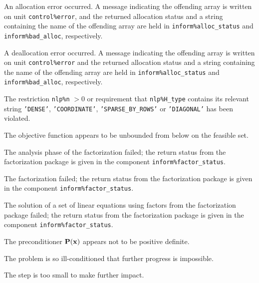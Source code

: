 \documentclass{galahad}
\begin{document}
\begin{description}

 An allocation error occurred.
A message indicating the offending
array is written on unit {\tt control\%error}, and the returned allocation
status and a string containing the name of the offending array
are held in {\tt inform\%alloc\_\-status}
and {\tt inform\%bad\_alloc}, respectively.

 A deallocation error occurred.
A message indicating the offending
array is written on unit {\tt control\%error} and the returned allocation
status and a string containing the name of the offending array
are held in {\tt inform\%alloc\_\-status}
and {\tt inform\%bad\_alloc}, respectively.

  The restriction {\tt nlp\%n} $> 0$
  or requirement that {\tt nlp\%H\_type} contains its relevant string
  {\tt 'DENSE'}, {\tt 'COORDINATE'}, {\tt 'SPARSE\_BY\_ROWS'}
  or {\tt 'DIAGONAL'}
  has been violated.


  The objective function appears to be unbounded
 from below on the feasible set.

 The analysis phase of the factorization failed;
 the return status from the factorization
    package is given in the component {\tt inform\%fac\-t\-or\_status}.

 The factorization failed;
 the return status from the factorization
    package is given in the component {\tt inform\%fac\-t\-or\_status}.

 The solution of a set of linear equations
 using factors from the factorization package failed;
 the return status from the factorization
    package is given in the component {\tt inform\%fac\-t\-or\_status}.

 The preconditioner ${\mathbf{P}}({\mathbf{x}})$ appears not to
  be positive definite.

 The problem is so ill-conditioned that
  further progress is impossible.

 The step is too small to make further impact.


\end{description}
\end{document}
